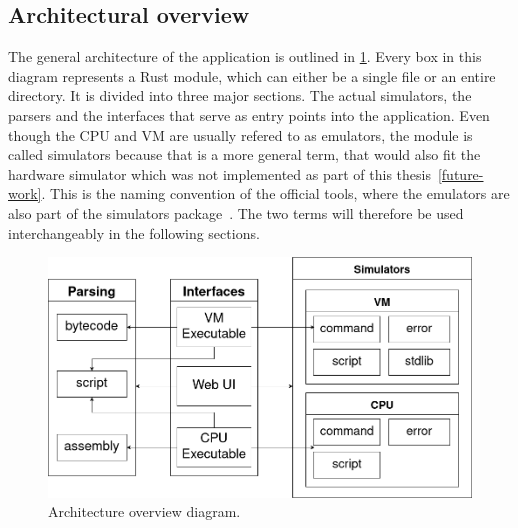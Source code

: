 
\subsection{Architectural overview}
The general architecture of the application is outlined in \cref{fig:arch}. Every box in this diagram represents a Rust module, which can either be a single file or an entire directory.
It is divided into three major sections. The actual simulators, the parsers and the interfaces that serve as entry points into the application. Even though the CPU and VM are usually refered to as emulators, the module is called simulators because that is a more general term, that would also fit the hardware simulator which was not implemented as part of this thesis~\ref{future-work}. This is the naming convention of the official tools, where the emulators are also part of the simulators package~\cite{n2tsimulators}. The two terms will therefore be used interchangeably in the following sections.

\begin{center}
  \begin{figure}[ht]
    \centering
    \includegraphics[width=12cm]{fig/architecture.png}
    \caption{Architecture overview diagram.}%
    \label{fig:arch}
  \end{figure}
\end{center}

